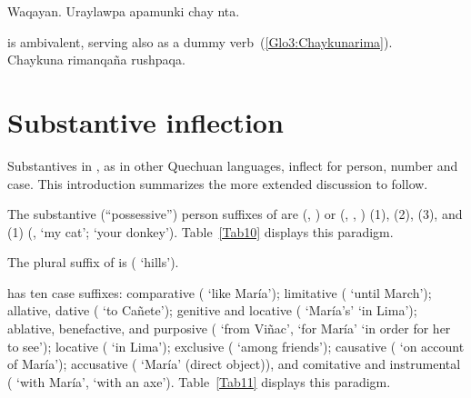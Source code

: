 %
{Waqayan. Uraylawpa apamunki chay nta.}%
{}%
{}{}%

\noindent
{} is ambivalent, serving also as a dummy verb~(\ref{Glo3:Chaykunarima}).\\

%
{Chaykuna rimanqaña rushpaqa.}%
{}%
{}{}%

\section{Substantive inflection}
Substantives in \SYQ, as in other Quechuan languages, inflect for person, number and case. This introduction summarizes the more extended discussion to follow. 

The substantive (“possessive”) person suffixes of \SYQ{} are  (\AMV, \LT) or \phono{-:} (\ACH, \CH, \SP) (1),  (2),  (3), and  (1) (,  ‘my cat’;  ‘your donkey’). Table~\ref{Tab10} displays this paradigm.

The plural suffix of \SYQ{} is  ( ‘hills’).

\SYQ{} has ten case suffixes: comparative  ( ‘like María’); limitative  ( ‘until March’); allative, dative  ( ‘to Cañete’); genitive and locative  ( ‘María’s’  ‘in Lima’); ablative, benefactive, and purposive  ( ‘from Viñac’,  ‘for María’  ‘in order for her to see’); locative  ( ‘in Lima’); exclusive  ( ‘among friends’); causative  ( ‘on account of María’); accusative  ( ‘María’ (direct object)), and comitative and instrumental  ( ‘with María’,  ‘with an axe’). Table~\ref{Tab11} displays this paradigm.

